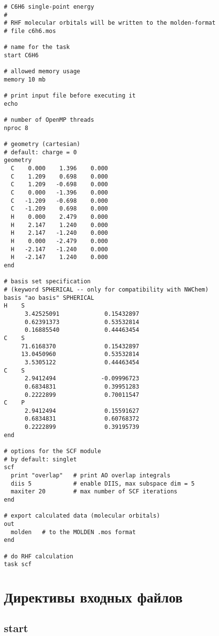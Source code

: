 \documentclass[a4paper, 12pt]{article}
\begin{document}
\begin{lstlisting}
# C6H6 single-point energy
#
# RHF molecular orbitals will be written to the molden-format
# file c6h6.mos

# name for the task
start C6H6

# allowed memory usage
memory 10 mb

# print input file before executing it
echo

# number of OpenMP threads
nproc 8

# geometry (cartesian)
# default: charge = 0
geometry
  C    0.000    1.396    0.000
  C    1.209    0.698    0.000
  C    1.209   -0.698    0.000
  C    0.000   -1.396    0.000
  C   -1.209   -0.698    0.000
  C   -1.209    0.698    0.000
  H    0.000    2.479    0.000
  H    2.147    1.240    0.000
  H    2.147   -1.240    0.000
  H    0.000   -2.479    0.000
  H   -2.147   -1.240    0.000
  H   -2.147    1.240    0.000
end

# basis set specification
# (keyword SPHERICAL -- only for compatibility with NWChem)
basis "ao basis" SPHERICAL
H    S
      3.42525091             0.15432897       
      0.62391373             0.53532814       
      0.16885540             0.44463454  
C    S
     71.6168370              0.15432897       
     13.0450960              0.53532814       
      3.5305122              0.44463454       
C    S
      2.9412494             -0.09996723
      0.6834831              0.39951283    
      0.2222899              0.70011547            
C    P
      2.9412494              0.15591627       
      0.6834831              0.60768372       
      0.2222899              0.39195739    
end

# options for the SCF module
# by default: singlet
scf
  print "overlap"   # print AO overlap integrals
  diis 5            # enable DIIS, max subspace dim = 5
  maxiter 20        # max number of SCF iterations
end

# export calculated data (molecular orbitals)
out
  molden   # to the MOLDEN .mos format
end

# do RHF calculation
task scf
\end{lstlisting}


\section{Директивы входных файлов}\label{sec:details}

\subsection{start}
\end{document}
